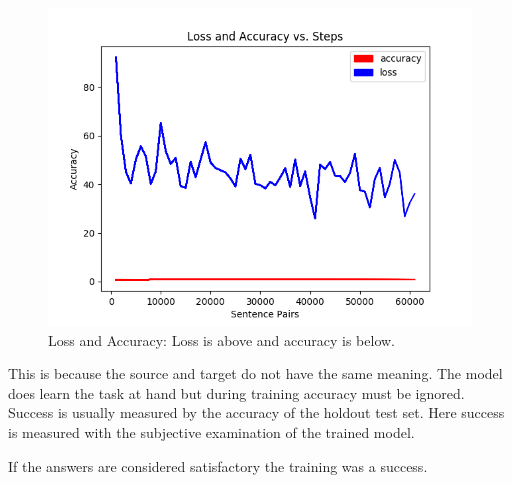 \begin{figure}[H]
	\begin{center}
	
	\includegraphics[scale=0.5]{Figure_1}
		
\end{center}
	\caption[Loss and Accuracy]{Loss and Accuracy: Loss is above and accuracy is below.}
	

\end{figure}

This is because the source and target do not have the same meaning. The model does learn the task at hand but during training accuracy must be ignored. Success is usually measured by the accuracy of the holdout test set. Here success is measured with the subjective examination of the trained model.

If the answers are considered satisfactory the training was a success. 

